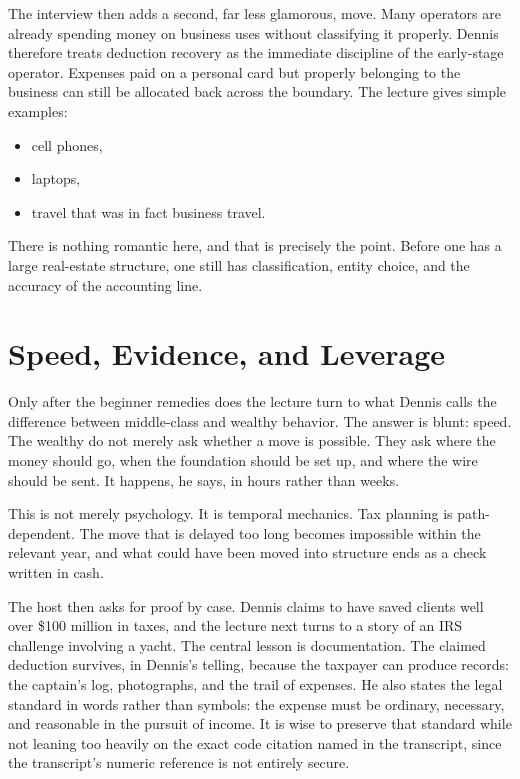 The interview then adds a second, far less glamorous, move. Many operators are already spending money on business uses without classifying it properly. Dennis therefore treats deduction recovery as the immediate discipline of the early-stage operator. Expenses paid on a personal card but properly belonging to the business can still be allocated back across the boundary. The lecture gives simple examples:
\begin{itemize}
\item cell phones,
\item laptops,
\item travel that was in fact business travel.
\end{itemize}
There is nothing romantic here, and that is precisely the point. Before one has a large real-estate structure, one still has classification, entity choice, and the accuracy of the accounting line.

\section{Speed, Evidence, and Leverage}

Only after the beginner remedies does the lecture turn to what Dennis calls the difference between middle-class and wealthy behavior. The answer is blunt: speed. The wealthy do not merely ask whether a move is possible. They ask where the money should go, when the foundation should be set up, and where the wire should be sent. It happens, he says, in hours rather than weeks.

This is not merely psychology. It is temporal mechanics. Tax planning is path-dependent. The move that is delayed too long becomes impossible within the relevant year, and what could have been moved into structure ends as a check written in cash.

The host then asks for proof by case. Dennis claims to have saved clients well over \$100 million in taxes, and the lecture next turns to a story of an IRS challenge involving a yacht. The central lesson is documentation. The claimed deduction survives, in Dennis's telling, because the taxpayer can produce records: the captain's log, photographs, and the trail of expenses. He also states the legal standard in words rather than symbols: the expense must be ordinary, necessary, and reasonable in the pursuit of income. It is wise to preserve that standard while not leaning too heavily on the exact code citation named in the transcript, since the transcript's numeric reference is not entirely secure.

